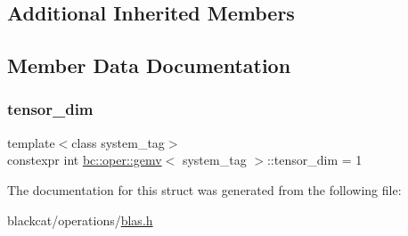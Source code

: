 \subsection*{Additional Inherited Members}


\subsection{Member Data Documentation}
\mbox{\label{structbc_1_1oper_1_1gemv_a0d6a305d67924dfb796996252a18eedc}} 
\subsubsection{\texorpdfstring{tensor\+\_\+dim}{tensor\_dim}}
{\footnotesize\ttfamily template$<$class system\+\_\+tag$>$ \\
constexpr int \hyperlink{structbc_1_1oper_1_1gemv}{bc\+::oper\+::gemv}$<$ system\+\_\+tag $>$\+::tensor\+\_\+dim = 1\hspace{0.3cm}{\ttfamily [static]}}



The documentation for this struct was generated from the following file\+:\begin{DoxyCompactItemize}
\item 
blackcat/operations/\hyperlink{operations_2blas_8h}{blas.\+h}\end{DoxyCompactItemize}
